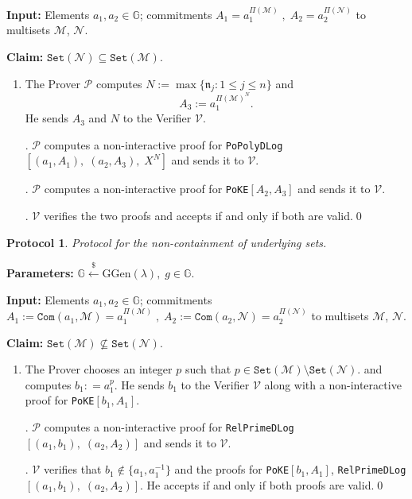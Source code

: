 \documentclass[11pt, lettersize, notitlepage, leqno, footskip=0.6cm]{article}
\newcommand{\ttt}{\texttt}
\newcommand{\sett}{\ttt{Set}}
\newcommand{\mf}{\mathfrak}
\newcommand{\mc}{\mathcal}
\newcommand{\mb}{\mathbb}
\newcommand{\mr}{\mathrm}
\newcommand{\lamb}{\lambda}
\newcommand{\sub}{\subseteq}
\newcommand{\nsub}{\nsubseteq}
\newcommand{\mP}{\mc{P}}
\newcommand{\V}{\mc{V}}
\newcommand{\vs}{\vspace{-0.15cm}}
\newcommand{\noin}{\noindent}
\newtheorem{Prot}[Thm]{Protocol}
\numberwithin{equation}{section}
\begin{document}
\noin \textbf{Input:} Elements $a_1,a_2\in\mb{G}$; commitments $A_1 = a_1^{\Pi(\mc{M})}\;,\;A_2 = a_2^{\Pi(\mc{N})}$ to multisets $\mc{M}$, $\mc{N}$.

\noin \textbf{Claim:} $\sett(\mc{N})\sub \sett(\mc{M})$. \vs

\begin{enumerate}[wide, labelwidth=!, labelindent=0pt] \item The Prover $\mP$ computes $N:= \max\{\mf{n}_j:1\leq j\leq n \}$ and \vs $$A_3:= a_1^{\Pi(\mc{M})^N}.$$ He sends $A_3$ and $N$ to the Verifier $\V$.

\noin 2. $\mP$ computes a non-interactive proof for \verb|PoPolyDLog|$[(a_1, A_1),\;(a_2, A_3),\;X^N]$ and sends it to $\V$.

\noin 3. $\mP$ computes a non-interactive proof for \verb|PoKE|$[A_2,A_3]$ and sends it to $\V$.

\noin 4. $\V$ verifies the two proofs and accepts if and only if both are valid.\qed \end{enumerate}

\vspace{0.15cm}

\begin{Prot} Protocol for the non-containment of underlying sets.\end{Prot}\vspace{-0.3cm}

\noin \textbf{Parameters:} $\mb{G}\xleftarrow{\$} \mr{GGen}(\lamb), \; g\in \mb{G}$. 

\noin \textbf{Input:} Elements $a_1,a_2\in\mb{G}$; commitments $A_1 := \ttt{Com}(a_1, \mc{M}) = a_1^{\Pi(\mc{M})}\;,\;A_2 := \ttt{Com}(a_2, \mc{N})= a_2^{\Pi(\mc{N})}$ to multisets $\mc{M}$, $\mc{N}$.

\noin \textbf{Claim:} $\sett(\mc{M})\nsub \sett(\mc{N})$. \vs

\begin{enumerate}[wide, labelwidth=!, labelindent=0pt] \item The Prover chooses an integer $p$ such that $p\in \sett(\mc{M})\setminus \sett(\mc{N}).$ and computes $b_1: = a_1^p$. He sends $b_1$ to the Verifier $\V$ along with a non-interactive proof for \verb|PoKE|$[b_1, A_1]$.

\noin 2. $\mP$ computes a non-interactive proof for \verb|RelPrimeDLog|$[(a_1, b_1),\; (a_2, A_2)]$ and sends it to $\V$.

\noin 3. $\V$ verifies that $b_1\notin \{ a_1, a_1^{-1}\}$ and the proofs for \verb|PoKE|$[b_1, A_1]$, \verb|RelPrimeDLog|$[(a_1, b_1),\; (a_2, A_2)]$. He accepts if and only if both proofs are valid.\qed \end{enumerate}
\end{document}
